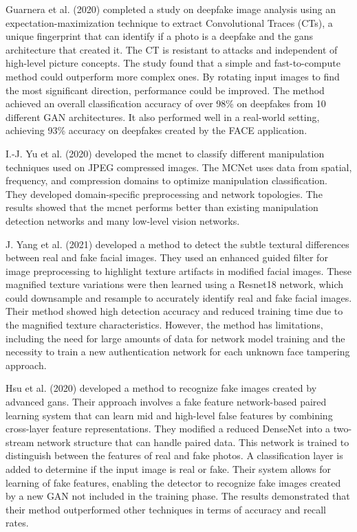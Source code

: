Guarnera et al. (2020)\cite{guarnera2020fighting} completed a study on deepfake image analysis using an expectation-maximization technique to extract Convolutional Traces (CTs), a unique fingerprint that can identify if a photo is a deepfake and the \acrshort{gans} architecture that created it. The CT is resistant to attacks and independent of high-level picture concepts. The study found that a simple and fast-to-compute method could outperform more complex ones. By rotating input images to find the most significant direction, performance could be improved. The method achieved an overall classification accuracy of over 98\% on deepfakes from 10 different GAN architectures. It also performed well in a real-world setting, achieving 93\% accuracy on deepfakes created by the FACE application.

I.-J. Yu et al. (2020)\cite{yu2020manipulation} developed the \acrfull{mcnet} to classify different manipulation techniques used on JPEG compressed images. The MCNet uses data from spatial, frequency, and compression domains to optimize manipulation classification. They developed domain-specific preprocessing and network topologies. The results showed that the \acrshort{mcnet} performs better than existing manipulation detection networks and many low-level vision networks.

J. Yang et al. (2021)\cite{yang2021detecting} developed a method to detect the subtle textural differences between real and fake facial images. They used an enhanced guided filter for image preprocessing to highlight texture artifacts in modified facial images. These magnified texture variations were then learned using a Resnet18 network, which could downsample and resample to accurately identify real and fake facial images. Their method showed high detection accuracy and reduced training time due to the magnified texture characteristics. However, the method has limitations, including the need for large amounts of data for network model training and the necessity to train a new authentication network for each unknown face tampering approach.

Hsu et al. (2020) \cite{hung2021multi} developed a method to recognize fake images created by advanced \acrshort{gans}. Their approach involves a fake feature network-based paired learning system that can learn mid and high-level false features by combining cross-layer feature representations. They modified a reduced DenseNet into a two-stream network structure that can handle paired data. This network is trained to distinguish between the features of real and fake photos. A classification layer is added to determine if the input image is real or fake. Their system allows for learning of fake features, enabling the detector to recognize fake images created by a new GAN not included in the training phase. The results demonstrated that their method outperformed other techniques in terms of accuracy and recall rates.

